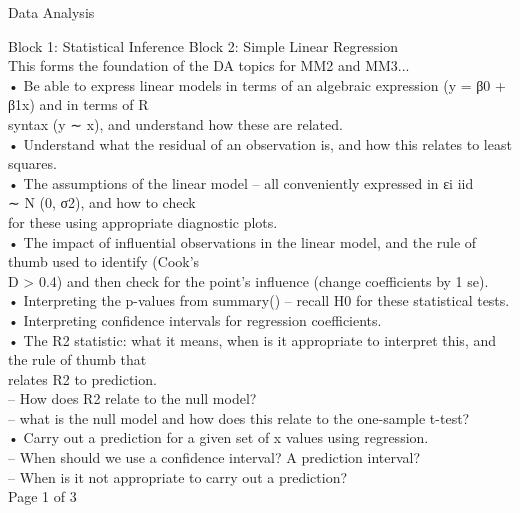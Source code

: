 \documentclass[
  ignorenonframetext,
]{beamer}
\begin{document}
\begin{frame}{Data Analysis}
\begin{block}{Block 1: Statistical Inference}
Block 2: Simple Linear Regression\\
This forms the foundation of the DA topics for MM2 and MM3...\\
• Be able to express linear models in terms of an algebraic expression
(y = β0 + β1x) and in terms of R\\
syntax (y ∼ x), and understand how these are related.\\
• Understand what the residual of an observation is, and how this
relates to least squares.\\
• The assumptions of the linear model -- all conveniently expressed in
εi iid\\
∼ N (0, σ2), and how to check\\
for these using appropriate diagnostic plots.\\
• The impact of influential observations in the linear model, and the
rule of thumb used to identify (Cook's\\
D \textgreater{} 0.4) and then check for the point's influence (change
coefficients by 1 se).\\
• Interpreting the p-values from summary() -- recall H0 for these
statistical tests.\\
• Interpreting confidence intervals for regression coefficients.\\
• The R2 statistic: what it means, when is it appropriate to interpret
this, and the rule of thumb that\\
relates R2 to prediction.\\
-- How does R2 relate to the null model?\\
-- what is the null model and how does this relate to the one-sample
t-test?\\
• Carry out a prediction for a given set of x values using regression.\\
-- When should we use a confidence interval? A prediction interval?\\
-- When is it not appropriate to carry out a prediction?\\
Page 1 of 3


\end{block}
\end{frame}
\end{document}
